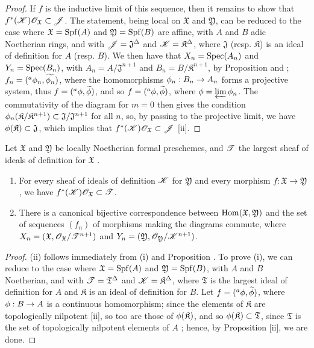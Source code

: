 \begin{proof}
If $f$ is the inductive limit of this sequence, then it remains to show that $f^*(\mathscr{K})\mathscr{O}_\mathfrak{X}\subset\mathscr{J}$.
The statement, being local on $\mathfrak{X}$ and $\mathfrak{Y}$, can be reduced to the case where $\mathfrak{X}=\operatorname{Spf}(A)$ and $\mathfrak{Y}=\operatorname{Spf}(B)$ are affine, with $A$ and $B$ adic Noetherian rings, and with $\mathscr{J}=\mathfrak{J}^\Delta$ and $\mathscr{K}=\mathfrak{K}^\Delta$, where $\mathfrak{J}$ (resp. $\mathfrak{K}$) is an ideal of definition for $A$ (resp. $B$).
We then have that $X_n=\operatorname{Spec}(A_n)$ and $Y_n=\operatorname{Spec}(B_n)$, with $A_n=A/\mathfrak{J}^{n+1}$ and $B_n=B/\mathfrak{K}^{n+1}$, by Proposition  and ; $f_n=({}^a\phi_n,\widetilde{\phi_n})$, where the homomorphisms $\vphi_n:B_n\to A_n$ forms a projective system, thus $f=({}^a\phi,\widetilde{\phi})$, and so $f=({}^a\phi,\widetilde{\phi})$, where $\phi=\varprojlim\phi_n$.
The commutativity of the diagram  for $m=0$ then gives the condition $\phi_n(\mathfrak{K}/\mathfrak{K}^{n+1})\subset\mathfrak{J}/\mathfrak{J}^{n+1}$ for all $n$, so, by passing to the projective limit, we have $\phi(\mathfrak{K})\subset\mathfrak{J}$, which implies that $f^*(\mathscr{K})\mathscr{O}_\mathfrak{X}\subset\mathscr{J}$ [ii].
\end{proof}

\begin{corollary}[10.6.10]
\label{I.10.6.10}
Let $\mathfrak{X}$ and $\mathfrak{Y}$ be locally Noetherian formal preschemes, and $\mathscr{T}$ the largest sheaf of ideals of definition for $\mathfrak{X}$ .
\begin{enumerate}
  \item[\rm{(i)}] For every sheaf of ideals of definition $\mathscr{K}$ for $\mathfrak{Y}$ and every morphism $f:\mathfrak{X}\to\mathfrak{Y}$, we have $f^*(\mathscr{K})\mathscr{O}_\mathfrak{X}\subset\mathscr{T}$.
  \item[\rm{(ii)}] There is a canonical bijective correspondence between $\operatorname{Hom}(\mathfrak{X},\mathfrak{Y})$ and the set of sequences $(f_n)$ of morphisms making the diagrams  commute, where $X_n=(\mathfrak{X},\mathscr{O}_\mathfrak{X}/\mathscr{T}^{n+1})$ and $Y_n=(\mathfrak{Y},\mathscr{O}_\mathfrak{Y}/\mathscr{K}^{n+1})$.
\end{enumerate}
\end{corollary}

\begin{proof}
(ii) follows immediately from (i) and Proposition .
To prove (i), we can reduce to the case where $\mathfrak{X}=\operatorname{Spf}(A)$ and $\mathfrak{Y}=\operatorname{Spf}(B)$, with $A$ and $B$ Noetherian, and with $\mathscr{T}=\mathfrak{T}^\Delta$ and $\mathscr{K}=\mathfrak{K}^\Delta$, where $\mathfrak{T}$ is the largest ideal of definition for $A$ and $\mathfrak{K}$ is an ideal of definition for $B$.
Let $f=({}^a\phi,\widetilde{\phi})$, where $\vphi:B\to A$ is a continuous homomorphism; since the elements of $\mathfrak{K}$ are topologically nilpotent [ii], so too are those of $\phi(\mathfrak{K})$, and so $\phi(\mathfrak{K})\subset\mathfrak{T}$, since $\mathfrak{T}$ is the set of topologically nilpotent elements of $A$ ; hence, by Proposition [ii], we are done.
\end{proof}

